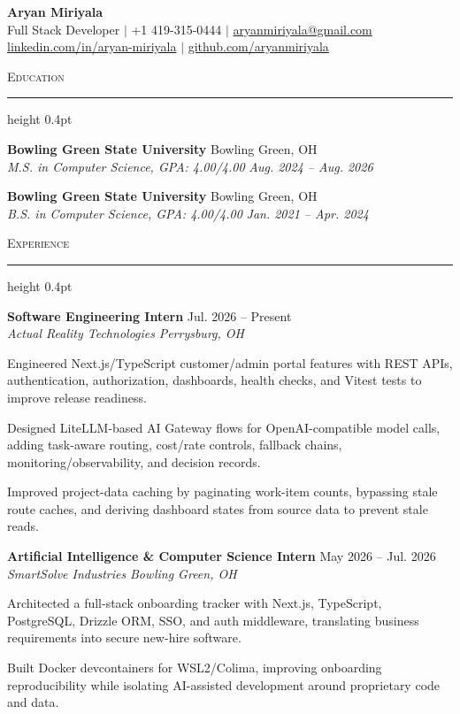 \documentclass[letterpaper,11pt]{article}
\newcommand{\resumesection}[1]{%
  \par\vspace{2pt}%
  {\large\scshape #1}\par\vspace{2pt}%
  \hrule height 0.4pt\vspace{2pt}%
}
\newcommand{\resumeSubheading}[4]{
  \textbf{#1} \hfill #2\\
  \textit{#3} \hfill \textit{#4}
}
\begin{document}
\begin{center}
  {\LARGE \textbf{Aryan Miriyala}}\\[-1pt]
  \small
  Full Stack Developer $|$
  +1 419-315-0444 $|$
  \href{mailto:aryanmiriyala@gmail.com}{aryanmiriyala@gmail.com}\\[-1pt]
  \href{https://www.linkedin.com/in/aryan-miriyala-7788a21b6/}{linkedin.com/in/aryan-miriyala} $|$
  \href{https://github.com/aryanmiriyala}{github.com/aryanmiriyala}
\end{center}\vspace{-10pt}

\resumesection{Education}
\resumeSubheading
{Bowling Green State University}{Bowling Green, OH}
{M.S. in Computer Science, GPA: 4.00/4.00}{Aug. 2024 -- Aug. 2026}

\resumeSubheading
{Bowling Green State University}{Bowling Green, OH}
{B.S. in Computer Science, GPA: 4.00/4.00}{Jan. 2021 -- Apr. 2024}

\resumesection{Experience}
\resumeSubheading
{Software Engineering Intern}{Jul. 2026 -- Present}
{Actual Reality Technologies}{Perrysburg, OH}
\begin{tightitemize}
  \item Engineered Next.js/TypeScript customer/admin portal features with REST APIs, authentication, authorization, dashboards, health checks, and Vitest tests to improve release readiness.
  \item Designed LiteLLM-based AI Gateway flows for OpenAI-compatible model calls, adding task-aware routing, cost/rate controls, fallback chains, monitoring/observability, and decision records.
  \item Improved project-data caching by paginating work-item counts, bypassing stale route caches, and deriving dashboard states from source data to prevent stale reads.
\end{tightitemize}

\resumeSubheading
{Artificial Intelligence \& Computer Science Intern}{May 2026 -- Jul. 2026}
{SmartSolve Industries}{Bowling Green, OH}
\begin{tightitemize}
  \item Architected a full-stack onboarding tracker with Next.js, TypeScript, PostgreSQL, Drizzle ORM, SSO, and auth middleware, translating business requirements into secure new-hire software.
  \item Built Docker devcontainers for WSL2/Colima, improving onboarding reproducibility while isolating AI-assisted development around proprietary code and data.
\end{tightitemize}
\end{document}
